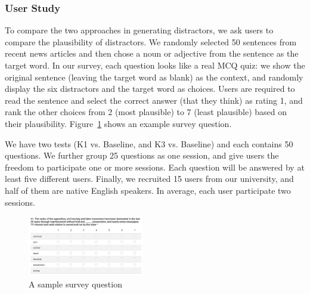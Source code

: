 \subsubsection{User Study}
To compare the two approaches in generating distractors, we ask users to compare the plausibility of distractors.
 We randomly selected 50 sentences from recent news articles and then chose a noun or adjective from the sentence as the target word. In our survey, each question looks like a real MCQ quiz: we show the original sentence (leaving the target word as blank) as the context, and randomly display the six distractors and the target word as choices. Users are required to read the sentence and select the correct answer (that they think) as rating 1, and rank the other choices from 2 (most plausible) to 7 (least plausible) based on their plausibility. Figure~\ref{fig:distractor_1} shows an example survey question.
 

We have two tests (K1  vs. Baseline, and K3  vs. Baseline) and each contains 50 questions. We further group 25 questions as one session, and give users the freedom to participate one or more sessions. Each question will be answered by at least five different users.
Finally, we recruited 15 users from our university, and half of them are native English speakers. 
In average, each user participate two sessions.






\begin{figure}[ht]
   \centering
   \includegraphics[width=0.45\textwidth]{distractor_1.jpg}
   \caption{A sample survey question}
   \label{fig:distractor_1}
\end{figure}

